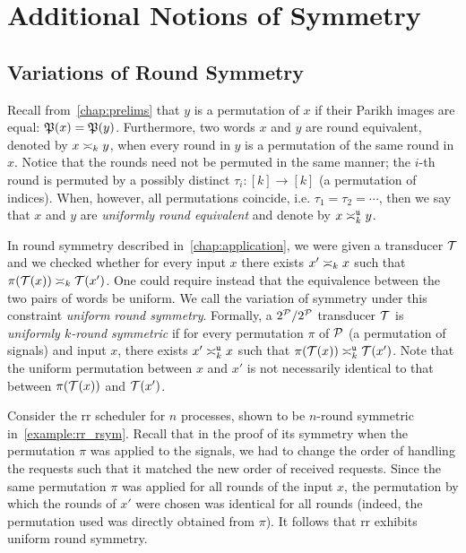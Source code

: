 \chapter{Additional Notions of Symmetry}
\label{chap:other_notions}

\section{Variations of Round Symmetry}
\label{sec:variations_rs}
\newcommand{\RSTYPES}{\ensuremath{\mathbf{MOP}}}
\newcommand{\RSTUPS}{\ensuremath{\mathbf{MOP}^2_k}}
\newcommand{\rstype}[1]{\mathtt{#1}}
\newcommand{\reqtype}[2][]{\req[#1]^{\rstype{#2}}}
\newcommand{\prectype}[2]{\prec^{\rstype{#1}, \rstype{#2}}}

Recall from~\cref{chap:prelims} that $y$ is a permutation of $x$ if their Parikh images are equal: $\fP(x)=\fP(y)$. Furthermore, two words $x$ and $y$ are round equivalent, denoted by $x\req[k] y$, when every round in $y$ is a permutation of the same round in $x$. Notice that the rounds need not be permuted in the same manner; the $i$-th round is permuted by a possibly distinct $\tau_i: [k]\rightarrow [k]$ (a permutation of indices). When, however, all permutations coincide, i.e. $\tau_1=\tau_2=\cdots$, then we say that $x$ and $y$ are \emph{uniformly round equivalent} and denote by $x\reqtype[k]{u} y$.

In round symmetry described in~\cref{chap:application}, we were given a transducer $\cT$ and we checked whether for every input $x$ there exists $x'\req[k] x$ such that $\pi(\cT(x))\req[k] \cT(x')$. One could require instead that the equivalence between the two pairs of words be uniform. We call the variation of symmetry under this constraint \emph{uniform round symmetry}. Formally, a $2^\cP/2^\cP$ transducer $\cT$ is \emph{uniformly $k$-round symmetric} if for every permutation $\pi$ of $\cP$ (a permutation of signals) and input $x$, there exists $x'\reqtype[k]{u} x$ such that $\pi(\cT(x))\reqtype[k]{u} \cT(x')$.
Note that the uniform permutation between $x$ and $x'$ is not necessarily identical to that between $\pi(\cT(x))$ and $\cT(x')$.

\begin{example}
Consider the \gls{rr} scheduler for $n$ processes, shown to be $n$-round symmetric in~\cref{example:rr_rsym}. Recall that in the proof of its symmetry when the permutation $\pi$ was applied to the signals, we had to change the order of handling the requests such that it matched the new order of received requests. Since the same permutation $\pi$ was applied for all rounds of the input $x$, the permutation by which the rounds of $x'$ were chosen was identical for all rounds (indeed, the permutation used was directly obtained from $\pi$). It follows that \gls{rr} exhibits uniform round symmetry.
\end{example}


